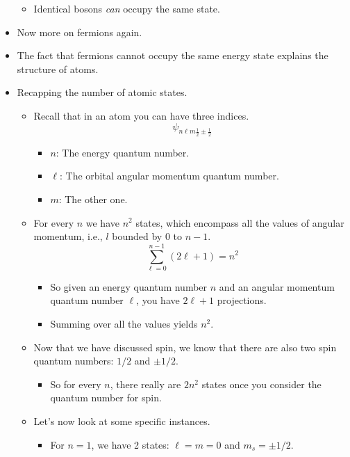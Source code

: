 \documentclass[../notes.tex]{subfiles}
\begin{document}
\begin{itemize}
\begin{itemize}
        \item Identical bosons \emph{can} occupy the same state.
    \end{itemize}
    \item Now more on fermions again.
    \item The fact that fermions cannot occupy the same energy state explains the structure of atoms.
    \item Recapping the number of atomic states.
    \begin{itemize}
        \item Recall that in an atom you can have three indices.
        \begin{equation*}
            \psi_{n\ell m\tfrac{1}{2}\pm\tfrac{1}{2}}
        \end{equation*}
        \begin{itemize}
            \item $n$: The energy quantum number.
            \item $\ell$: The orbital angular momentum quantum number.
            \item $m$: The other one.
        \end{itemize}
        \item For every $n$ we have $n^2$ states, which encompass all the values of angular momentum, i.e., $l$ bounded by $0$ to $n-1$.
        \begin{equation*}
            \sum_{\ell=0}^{n-1}(2\ell+1) = n^2
        \end{equation*}
        \begin{itemize}
            \item So given an energy quantum number $n$ and an angular momentum quantum number $\ell$, you have $2\ell+1$ projections.
            \item Summing over all the values yields $n^2$.
        \end{itemize}
        \item Now that we have discussed spin, we know that there are also two spin quantum numbers: $1/2$ and $\pm 1/2$.
        \begin{itemize}
            \item So for every $n$, there really are $2n^2$ states once you consider the quantum number for spin.
        \end{itemize}
        \item Let's now look at some specific instances.
        \begin{itemize}
            \item For $n=1$, we have 2 states: $\ell=m=0$ and $m_s=\pm 1/2$.

\end{itemize}
\end{itemize}
\end{itemize}
\end{document}
